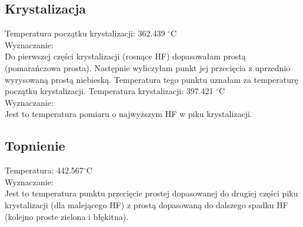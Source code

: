 \documentclass[a4paper,10pt]{article}
\begin{document}
\subsection{Krystalizacja}
Temperatura początku krystalizacji: 362.439 $^\circ$C \\
Wyznaczanie: \\
Do pierwszej części krystalizacji (rosnące HF) dopasowałam prostą (pomarańczowa prosta). Następnie wyliczyłam punkt jej przecięcia z uprzednio wyrysowaną prostą niebieską. Temperatura tego punktu uznałam za temperaturę początku krystalizacji.
Temperatura krystalizacji: 397.421 $^\circ$C \\
Wyznaczanie: \\
Jest to temperatura pomiaru o najwyższym HF w piku krystalizacji.

\subsection{Topnienie}
Temperatura: 442.567$^\circ$C \\
Wyznaczanie: \\
Jest to temperatura punktu przecięcie prostej dopasowanej do drugiej części piku krystalizacji (dla malejącego HF) z prostą dopasowaną do dalszego spadku HF (kolejno proste zielona i błękitna).
 
\end{document}
